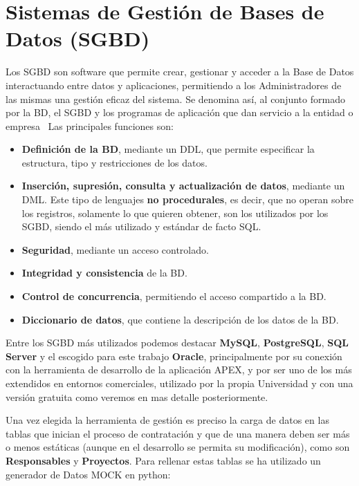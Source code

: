 \section{Sistemas de Gestión de Bases de Datos (\acrshort{SGBD})} \label{sec:SGBD}
Los \acrshort{SGBD} son software que permite crear, gestionar y acceder a la Base de Datos interactuando entre datos y aplicaciones, permitiendo a los Administradores de las mismas una gestión eficaz del sistema. Se denomina así, al conjunto formado por la BD, el \acrfull{SGBD} y los programas de aplicación que dan servicio a la entidad o empresa~\cite{AbrahamSilberschatzFundamentosBasesDatos2006}\cite{MarquesBasesDatos2011}
Las principales funciones son:
\begin{itemize}
	\item \textbf{Definición de la BD}, mediante un \acrfull{DDL}, que permite especificar la estructura, tipo y restricciones de los datos.
	\item \textbf{Inserción, supresión, consulta y actualización de datos}, mediante un \acrfull{DML}. Este tipo de lenguajes \textbf{no procedurales}, es decir, que no operan sobre los registros, solamente lo que quieren obtener, son los utilizados por los \acrshort{SGBD}, siendo el más utilizado y estándar de facto \acrfull{SQL}.
	\item \textbf{Seguridad}, mediante un acceso controlado.
	\item \textbf{Integridad y consistencia} de la BD.
	\item \textbf{Control de concurrencia}, permitiendo el acceso compartido a la BD.
	\item \textbf{Diccionario de datos}, que contiene la descripción de los datos de la BD.
\end{itemize}

Entre los \acrshort{SGBD} más utilizados podemos destacar \textbf{MySQL}, \textbf{PostgreSQL}, \textbf{SQL Server} y el escogido para este trabajo \textbf{Oracle}, principalmente por su conexión con la herramienta de desarrollo de la aplicación \acrshort{APEX}, y por ser uno de los más extendidos en entornos comerciales, utilizado por la propia Universidad y con una versión gratuita como veremos en mas detalle posteriormente.

Una vez elegida la herramienta de gestión es preciso la carga de datos en las tablas que inician el proceso de contratación y que de una manera deben ser más o menos estáticas (aunque en el desarrollo se permita su modificación), como son \textbf{Responsables} y \textbf{Proyectos}. Para rellenar estas tablas se ha utilizado un generador de \gls{Datos MOCK} en python:

